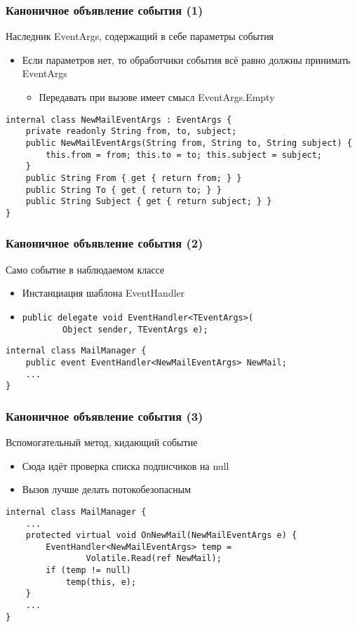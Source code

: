 \documentclass[xetex,mathserif,serif]{beamer}
\begin{document}
	\begin{frame}[fragile]
		\frametitle{Каноничное объявление события (1)}
		Наследник EventArgs, содержащий в себе параметры события
		\begin{itemize}
			\item Если параметров нет, то обработчики события всё равно должны принимать EventArgs
			\begin{itemize}
				\item Передавать при вызове имеет смысл EventArgs.Empty
			\end{itemize}
		\end{itemize}

		\vspace{3mm}
		\begin{verbatim}
internal class NewMailEventArgs : EventArgs {
    private readonly String from, to, subject;
    public NewMailEventArgs(String from, String to, String subject) {
        this.from = from; this.to = to; this.subject = subject;
    }
    public String From { get { return from; } }
    public String To { get { return to; } }
    public String Subject { get { return subject; } }
}
		\end{verbatim}
	\end{frame}

	\begin{frame}[fragile]
		\frametitle{Каноничное объявление события (2)}
		Само событие в наблюдаемом классе
		\begin{itemize}
			\item Инстанциация шаблона EventHandler
			\item 
				\begin{verbatim}
public delegate void EventHandler<TEventArgs>(
        Object sender, TEventArgs e);
				\end{verbatim}
		\end{itemize}

		\vspace{7mm}
		\begin{verbatim}
internal class MailManager {
    public event EventHandler<NewMailEventArgs> NewMail;
    ...
}
		\end{verbatim}
	\end{frame}

	\begin{frame}[fragile]
		\frametitle{Каноничное объявление события (3)}
		Вспомогательный метод, кидающий событие
		\begin{itemize}
			\item Сюда идёт проверка списка подписчиков на null
			\item Вызов лучше делать потокобезопасным
		\end{itemize}
		\vspace{5mm}
		\begin{verbatim}
internal class MailManager {
    ...
    protected virtual void OnNewMail(NewMailEventArgs e) {
        EventHandler<NewMailEventArgs> temp = 
                Volatile.Read(ref NewMail);
        if (temp != null) 
            temp(this, e);
    }
    ...
}
		\end{verbatim}
	\end{frame}
\end{document}
